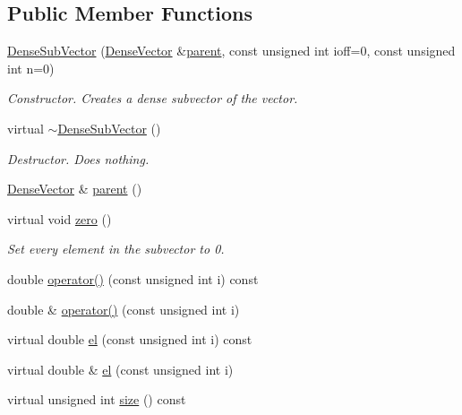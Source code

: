 \subsection*{Public Member Functions}
\begin{DoxyCompactItemize}
\item 
\mbox{\hyperlink{classfemus_1_1_dense_sub_vector_a321eb522717c8ac3d322c2d9ad367e11}{Dense\+Sub\+Vector}} (\mbox{\hyperlink{classfemus_1_1_dense_vector}{Dense\+Vector}} \&\mbox{\hyperlink{classfemus_1_1_dense_sub_vector_a0daed4a44c5471622d5b6600acef2298}{parent}}, const unsigned int ioff=0, const unsigned int n=0)
\begin{DoxyCompactList}\small\item\em Constructor. Creates a dense subvector of the vector. \end{DoxyCompactList}\item 
virtual \mbox{\hyperlink{classfemus_1_1_dense_sub_vector_ab4a41a2c3e8cf97c9e2680d9d250f115}{$\sim$\+Dense\+Sub\+Vector}} ()
\begin{DoxyCompactList}\small\item\em Destructor. Does nothing. \end{DoxyCompactList}\item 
\mbox{\hyperlink{classfemus_1_1_dense_vector}{Dense\+Vector}} \& \mbox{\hyperlink{classfemus_1_1_dense_sub_vector_a0daed4a44c5471622d5b6600acef2298}{parent}} ()
\item 
virtual void \mbox{\hyperlink{classfemus_1_1_dense_sub_vector_a20fd1054159ce0a69af4d28199dd704f}{zero}} ()
\begin{DoxyCompactList}\small\item\em Set every element in the subvector to 0. \end{DoxyCompactList}\item 
double \mbox{\hyperlink{classfemus_1_1_dense_sub_vector_ad342710f5d826cff8b5b87dd5e7f1091}{operator()}} (const unsigned int i) const
\item 
double \& \mbox{\hyperlink{classfemus_1_1_dense_sub_vector_a815b31cc0fc273a1c82835c0e9fdf40b}{operator()}} (const unsigned int i)
\item 
virtual double \mbox{\hyperlink{classfemus_1_1_dense_sub_vector_a7e95ed027b438413f00d790ff5c95fb2}{el}} (const unsigned int i) const
\item 
virtual double \& \mbox{\hyperlink{classfemus_1_1_dense_sub_vector_a5cb51e53b54d085933d2ebe6f762ecd1}{el}} (const unsigned int i)
\item 
virtual unsigned int \mbox{\hyperlink{classfemus_1_1_dense_sub_vector_ac7267bc849d12ec7c84481a9fa9a87ce}{size}} () const

\end{DoxyCompactItemize}
